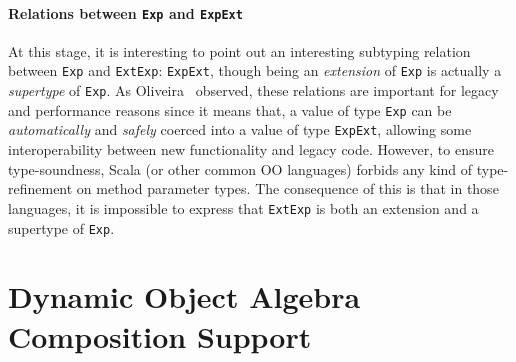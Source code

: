 \paragraph{Relations between \lstinline{Exp} and \lstinline{ExpExt}}
At this stage, it is interesting to point out an interesting subtyping relation
between \lstinline{Exp} and \lstinline{ExtExp}: \lstinline{ExpExt}, though being an
\emph{extension} of \lstinline{Exp} is actually a \emph{supertype} of \lstinline{Exp}.
As Oliveira~\cite{oliveira09modular} observed, these relations are
important for legacy and performance reasons since it means that, a value of
type \lstinline{Exp} can be \emph{automatically} and \emph{safely}
coerced into a value of type \lstinline{ExpExt}, allowing some
interoperability between new functionality and legacy code.
However, to ensure type-soundness, Scala (or other common OO languages) forbids any kind of type-refinement on method
parameter types. The consequence of this is that in those languages, it is
impossible to express that \lstinline{ExtExp} is both an extension and a
supertype of \lstinline{Exp}.




\section{Dynamic Object Algebra Composition Support}

